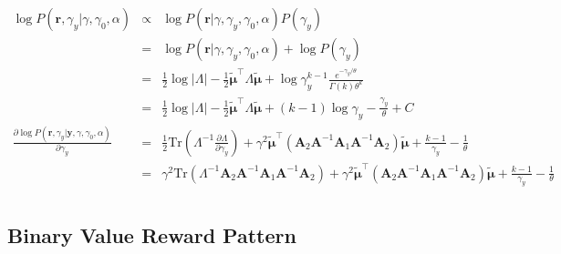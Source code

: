 \documentclass[platex, a4paper]{jsarticle}
\begin{document}
\begin{eqnarray}
  \log P( \bm{r}, \gamma_y | \gamma, \gamma_0, \alpha)
      &\propto& \log P( \bm{r} | \gamma, \gamma_y, \gamma_0, \alpha)P(\gamma_y) \\
      &=& \log P( \bm{r} | \gamma, \gamma_y, \gamma_0, \alpha) + \log P(\gamma_y) \\
      &=& \frac{1}{2} \log|\Lambda| - \frac{1}{2} \tilde{\bm{\mu}}^\top \Lambda \tilde{\bm{\mu}}
        + \log \gamma_y^{k-1} \frac{e^{-\gamma_y/\theta}}{\Gamma(k) \theta^k} \\
      &=& \frac{1}{2} \log|\Lambda| - \frac{1}{2} \tilde{\bm{\mu}}^\top \Lambda \tilde{\bm{\mu}}
        + (k-1)\log \gamma_y -  \frac{\gamma_y}{\theta} + C \\
  \frac{\partial \log P( \bm{r}, \gamma_y | \bm{y}, \gamma, \gamma_0, \alpha)}{\partial \gamma_y}
      &=& \frac{1}{2} \mathrm{Tr}( \Lambda^{-1} \frac{\partial \Lambda}{\partial \gamma_y})
        + \gamma^2   \tilde{\bm{\mu}}^\top \left(\bm{A}_2 \bm{A}^{-1} \bm{A}_1 \bm{A}^{-1} \bm{A}_2  \right)  \tilde{\bm{\mu}}
        + \frac{k-1}{\gamma_y} - \frac{1}{\theta} \\
      &=& \gamma^2 \mathrm{Tr}( \Lambda^{-1} \bm{A}_2 \bm{A}^{-1} \bm{A}_1 \bm{A}^{-1} \bm{A}_2)
        + \gamma^2  \tilde{\bm{\mu}}^\top \left(\bm{A}_2 \bm{A}^{-1} \bm{A}_1 \bm{A}^{-1} \bm{A}_2  \right)  \tilde{\bm{\mu}}
        + \frac{k-1}{\gamma_y} - \frac{1}{\theta} \\
\end{eqnarray}

\subsection{Binary Value Reward Pattern}
\end{document}
